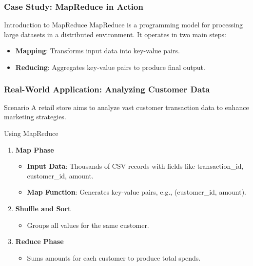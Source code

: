 \documentclass[aspectratio=169]{beamer}
\begin{document}
\begin{frame}[fragile]
    \frametitle{Case Study: MapReduce in Action}
    \begin{block}{Introduction to MapReduce}
        MapReduce is a programming model for processing large datasets in a distributed environment. 
        It operates in two main steps:
        \begin{itemize}
            \item \textbf{Mapping}: Transforms input data into key-value pairs.
            \item \textbf{Reducing}: Aggregates key-value pairs to produce final output.
        \end{itemize}
    \end{block}
\end{frame}

\begin{frame}[fragile]
    \frametitle{Real-World Application: Analyzing Customer Data}
    \begin{block}{Scenario}
        A retail store aims to analyze vast customer transaction data to enhance marketing strategies.
    \end{block}
  
    \begin{block}{Using MapReduce}
        \begin{enumerate}
            \item \textbf{Map Phase}
            \begin{itemize}
                \item \textbf{Input Data}: Thousands of CSV records with fields like transaction\_id, customer\_id, amount.
                \item \textbf{Map Function}: Generates key-value pairs, e.g., (customer\_id, amount).
            \end{itemize}

            \item \textbf{Shuffle and Sort}
            \begin{itemize}
                \item Groups all values for the same customer.
            \end{itemize}

            \item \textbf{Reduce Phase}
            \begin{itemize}
                \item Sums amounts for each customer to produce total spends.
            \end{itemize}
        \end{enumerate}
    \end{block}
\end{frame}
\end{document}
